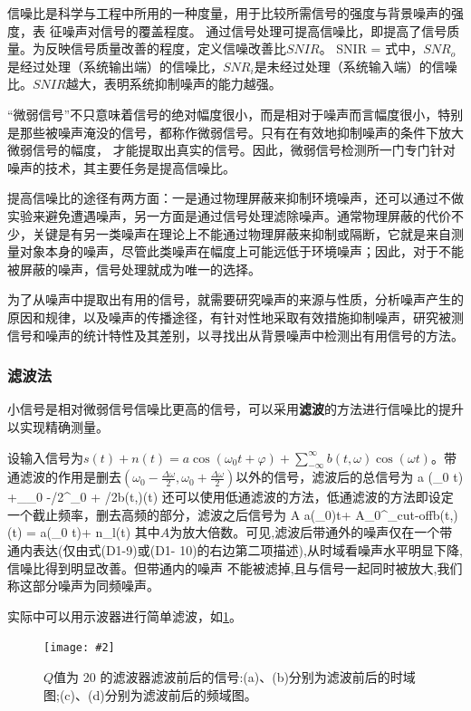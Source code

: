 \documentclass[11pt,a4paper]{ctexart}
\newcommand{\cpic}[2]{
\begin{center}
\texttt{[image: \#2]}
\end{center}
}
\newcommand{\cpicn}[3]
{
\begin{figure}[H]
\cpic{#1}{#2}
\caption{#3\label{#2}}
\end{figure}
}
\begin{document}
信噪比是科学与工程中所用的一种度量，用于比较所需信号的强度与背景噪声的强度，表 征噪声对信号的覆盖程度。
通过信号处理可提高信噪比，即提高了信号质量。为反映信号质量改善的程度，定义信噪改善比$SNIR$。
\beq
SNIR = 
\eeq
式中，$SNR_o$是经过处理（系统输出端）的信噪比，$SNR_i$是未经过处理（系统输入端）的信噪 比。$SNIR$越大，表明系统抑制噪声的能力越强。
\par
“微弱信号”不只意味着信号的绝对幅度很小，而是相对于噪声而言幅度很小，特别是那些被噪声淹没的信号，都称作微弱信号。只有在有效地抑制噪声的条件下放大微弱信号的幅度， 才能提取出真实的信号。因此，微弱信号检测所一门专门针对噪声的技术，其主要任务是提高信噪比。\par
提高信噪比的途径有两方面：一是通过物理屏蔽来抑制环境噪声，还可以通过不做实验来避免遭遇噪声，另一方面是通过信号处理滤除噪声。通常物理屏蔽的代价不少，关键是有另一类噪声在理论上不能通过物理屏蔽来抑制或隔断，它就是来自测量对象本身的噪声，尽管此类噪声在幅度上可能远低于环境噪声；因此，对于不能被屏蔽的噪声，信号处理就成为唯一的选择。\par
为了从噪声中提取出有用的信号，就需要研究噪声的来源与性质，分析噪声产生的原因和规律，以及噪声的传播途径，有针对性地采取有效措施抑制噪声，研究被测信号和噪声的统计特性及其差别，以寻找出从背景噪声中检测出有用信号的方法。
\subsubsection{滤波法}
\par
小信号是相对微弱信号信噪比更高的信号，可以采用{\bf 滤波}的方法进行信噪比的提升以实现精确测量。
\par
设输入信号为$s(t) + n(t)=a \cos(\omega_0 t+\varphi)+\sum_{-\infty}^{\infty}b(t,\omega)\cos(\omega t)$。带通滤波的作用是删去$(\omega_0 - \frac{\Delta \omega}{2} , \omega_0+ \frac{\Delta \omega}{2})$以外的信号，滤波后的总信号为
\beq
a \cos(\omega_0 t) +\sum_{\omega_0 -\Delta \omega/2}^{\omega_0 + \Delta\omega/2}b(t,\omega)\cos(\omega t)
\eeq
还可以使用低通滤波的方法，低通滤波的方法即设定一个截止频率，删去高频的部分，滤波之后信号为
\beq
A a\cos(\omega_0)t+ A\sum_0^{\omega_{\rm cut-off}}b(t,\omega)\cos(\omega t) = a\cos(\omega_0 t)+ n_l(t)
\eeq
其中$A$为放大倍数。可见,滤波后带通外的噪声仅在一个带通内表达(仅由式(D1-9)或(D1-
10)的右边第二项描述),从时域看噪声水平明显下降,信噪比得到明显改善。但带通内的噪声
不能被滤掉,且与信号一起同时被放大,我们称这部分噪声为同频噪声。
\par
实际中可以用示波器进行简单滤波，如\cref{filter}。
\cpicn{0.6}{filter}{$Q$值为 20 的滤波器滤波前后的信号:(a)、(b)分别为滤波前后的时域图;(c)、(d)分别为滤波前后的频域图。}
\end{document}
